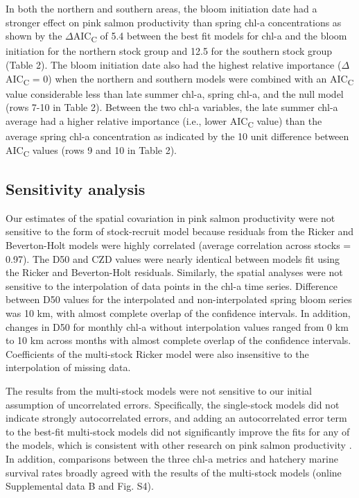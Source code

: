 In both the northern and southern areas, the bloom initiation date had a
stronger effect on pink salmon productivity than spring chl-a concentrations as
shown by the \(\Delta\)AIC\textsubscript{C} of 5.4 between the best fit models
for chl-a and the bloom initiation for the northern stock group and 12.5 for the
southern stock group (Table 2).  The bloom initiation date also had the highest
relative importance (\(\Delta\)AIC\textsubscript{C} = 0) when the northern and
southern models were combined with an AIC\textsubscript{C} value considerable
less than late summer chl-a, spring chl-a, and the null model (rows 7-10 in
Table 2). Between the two chl-a variables, the late summer chl-a average had a
higher relative importance (i.e., lower AIC\textsubscript{C} value) than the
average spring chl-a concentration as indicated by the 10 unit difference
between AIC\textsubscript{C} values (rows 9 and 10 in Table 2).

\subsection{Sensitivity analysis}

Our estimates of the spatial covariation in pink salmon productivity were not
sensitive to the form of stock-recruit model because residuals from the Ricker
and Beverton-Holt models were highly correlated (average correlation across
stocks = 0.97). The D50 and CZD values were nearly identical between models fit
using the Ricker and Beverton-Holt residuals. Similarly, the spatial analyses
were not sensitive to the interpolation of data points in the chl-a time series.
Difference between D50 values for the interpolated and non-interpolated spring
bloom series was 10 km, with almost complete overlap of the confidence
intervals. In addition, changes in D50 for monthly chl-a without interpolation
values ranged from 0 km to 10 km across months with almost complete overlap of
the confidence intervals. Coefficients of the multi-stock Ricker model were also
insensitive to the interpolation of missing data.

The results from the multi-stock models were not sensitive to our initial
assumption of uncorrelated errors. Specifically, the single-stock models did not
indicate strongly autocorrelated errors, and adding an autocorrelated error term
to the best-fit multi-stock models did not significantly improve the fits for
any of the models, which is consistent with other research on pink salmon
productivity \citep{Pyper2001a}. In addition, comparisons between the three
chl-a metrics and hatchery marine survival rates broadly agreed with the results
of the multi-stock models (online Supplemental data B and Fig.  S4).

